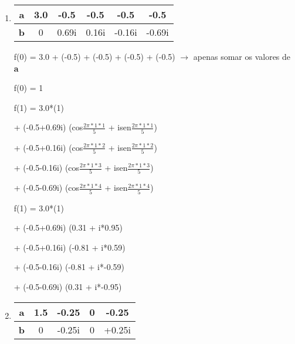 \begin{question}

    \begin{enumerate}[label=\textbf{\alph*})]
      \item
      
      \begin{minipage}{\linewidth}
        \centering 
        \begin{tabular}{|c|c|c|c|c|c|}
          \hline 
          \textbf{a} & 3.0 & -0.5 & -0.5 & -0.5 & -0.5  \\
          \hline 
          \textbf{b} & 0 & 0.69i & 0.16i & -0.16i & -0.69i \\ 
          \hline 
        \end{tabular}
      \end{minipage}


      f(0) = 3.0 + (-0.5) + (-0.5) + (-0.5) + (-0.5) $\rightarrow$ apenas somar os valores de \textbf{a}
      
      f(0) = 1

      f(1) = 3.0*(1) 
      
             + (-0.5+0.69i) (cos$\frac{2\pi*1*1}{5}$ + isen$\frac{2\pi*1*1}{5}$) 

             + (-0.5+0.16i) (cos$\frac{2\pi*1*2}{5}$ + isen$\frac{2\pi*1*2}{5}$)  

             + (-0.5-0.16i) (cos$\frac{2\pi*1*3}{5}$ + isen$\frac{2\pi*1*3}{5}$)  

             + (-0.5-0.69i) (cos$\frac{2\pi*1*4}{5 }$ + isen$\frac{2\pi*1*4}{5}$)  

      f(1) = 3.0*(1) 

             + (-0.5+0.69i) (0.31 + i*0.95) 

             + (-0.5+0.16i) (-0.81 + i*0.59)  

             + (-0.5-0.16i) (-0.81 + i*-0.59)  

             + (-0.5-0.69i) (0.31 + i*-0.95)  


      \item
      
      \begin{minipage}{\linewidth}
        \centering 
        \begin{tabular}{|c|c|c|c|c|}
          \hline 
          \textbf{a} & 1.5 & -0.25 & 0 & -0.25 \\
          \hline 
          \textbf{b} & 0 & -0.25i & 0 & +0.25i \\ 
          \hline 
        \end{tabular}
      \end{minipage}


\end{enumerate}
\end{question}
